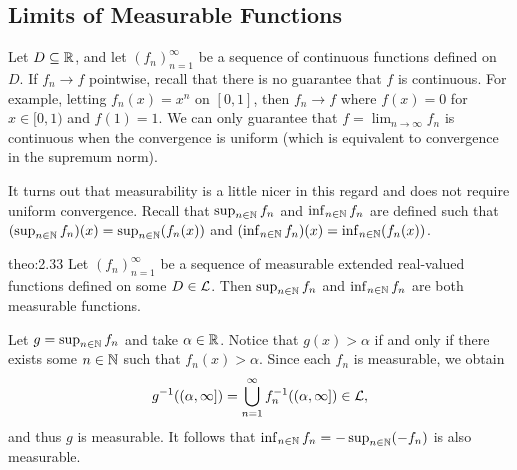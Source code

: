 \subsection{Limits of Measurable Functions} \label{subsec:2.5}
Let $D \subseteq \mathbb{R}$, and let $(f_n)_{n=1}^\infty$ be a sequence of 
continuous functions defined on $D$. If $f_n \to f$ pointwise, recall 
that there is no guarantee that $f$ is continuous. For example, 
letting $f_n(x) = x^n$ on $[0, 1]$, then $f_n \to f$ where 
$f(x) = 0$ for $x \in [0, 1)$ and $f(1) = 1$. We can only guarantee 
that $f = \lim_{n\to\infty} f_n$ is continuous when the convergence 
is uniform (which is equivalent to convergence in the supremum norm). 

It turns out that measurability is a little nicer in this regard
and does not require uniform convergence. Recall that 
$\sup_{n\in\mathbb{N}} f_n$ and $\inf_{n\in\mathbb{N}} f_n$ are defined such that 
$(\sup_{n\in\mathbb{N}} f_n)(x) = \sup_{n\in\mathbb{N}} (f_n(x))$ and 
$(\inf_{n\in\mathbb{N}} f_n)(x) = \inf_{n\in\mathbb{N}} (f_n(x))$.

\begin{theo}{theo:2.33}
    Let $(f_n)_{n=1}^\infty$ be a sequence of measurable extended real-valued 
    functions defined on some $D \in {\cal L}$. Then $\sup_{n\in\mathbb{N}} f_n$ 
    and $\inf_{n\in\mathbb{N}} f_n$ are both measurable functions. 
\end{theo}
\begin{pf}
    Let $g = \sup_{n\in\mathbb{N}} f_n$ and take $\alpha \in \mathbb{R}$. Notice that 
    $g(x) > \alpha$ if and only if there exists some $n \in \mathbb{N}$ such that 
    $f_n(x) > \alpha$. Since each $f_n$ is measurable, we obtain
    \[ g^{-1}((\alpha, \infty]) = \bigcup_{n=1}^\infty f_n^{-1}((\alpha, 
    \infty]) \in {\cal L}, \] 
    and thus $g$ is measurable. It follows that $\inf_{n\in\mathbb{N}} f_n = 
    -\sup_{n\in\mathbb{N}} (-f_n)$ is also measurable. 
\end{pf}

